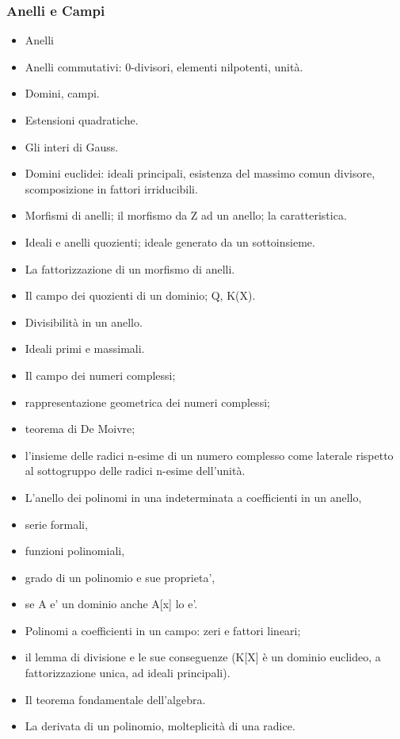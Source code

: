  \subsubsection*{Anelli e Campi}
 \begin{itemize}
   \item Anelli
 \item Anelli commutativi: 0-divisori, elementi nilpotenti, unità.
 \item Domini, campi. 
 \item Estensioni quadratiche. 
 \item Gli interi di Gauss. 
 \item Domini euclidei:  ideali principali, esistenza del massimo comun divisore, scomposizione in fattori irriducibili. 
 \item Morfismi di anelli; il morfismo da Z ad un anello; la caratteristica. 
 \item Ideali e anelli quozienti; ideale generato da un sottoinsieme. 
 \item La fattorizzazione di un morfismo di anelli. 
 \item Il campo dei quozienti di un dominio; Q, K(X). 
 \item Divisibilità in un anello. 
 \item Ideali primi e massimali.
 \item Il campo dei numeri complessi;
 \item rappresentazione geometrica dei numeri complessi; 
 \item teorema di De Moivre; 
 \item l'insieme delle radici n-esime di un numero complesso come laterale rispetto al sottogruppo delle radici n-esime dell'unità.
 \item L'anello dei polinomi in una indeterminata a coefficienti in un anello, 
 \item serie formali, 
 \item funzioni polinomiali, 
 \item grado di un polinomio e sue proprieta', 
 \item se A e' un dominio anche A[x] lo e'. 
 \item Polinomi a coefficienti in un campo: zeri e fattori lineari; 
 \item il lemma di divisione e le sue conseguenze (K[X] è un dominio euclideo, a fattorizzazione unica, ad ideali principali). 
 \item Il teorema fondamentale dell'algebra. 
 \item La derivata di un polinomio, molteplicità di una radice. 

\end{itemize}
